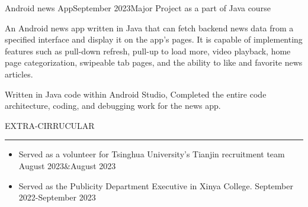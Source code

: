 \documentclass{resume} %
\renewenvironment{rSection}[1]{
\sectionskip
\textcolor{TsinghuaPurple}{\MakeUppercase{#1}}
\sectionlineskip
\hrule
\begin{list}{}{
\setlength{\leftmargin}{0em}
}
\item[]
}{
\end{list}
}
\begin{document}
\begin{rSubsection}{Android news App}{September 2023}{Major Project as a part of Java course}{}

\item An Android news app written in Java that can fetch backend news data from a specified interface and display it on the app's pages. It is capable of implementing features such as pull-down refresh, pull-up to load more, video playback, home page categorization, swipeable tab pages, and the ability to like and favorite news articles.
\item Written in Java code within Android Studio, Completed the entire code architecture, coding, and debugging work for the news app. 

\end{rSubsection}


\begin{rSection}{Extra-Cirrucular} \itemsep -2pt   

\begin{itemize}
 
\item Served as a volunteer for Tsinghua University’s Tianjin recruitment team \hfill August 2023\&August 2023 
\item Served as the Publicity Department Executive in Xinya College. \hfill September 2022-September 2023  
  
\end{itemize}  


\end{rSection} 

  
\end{document}
